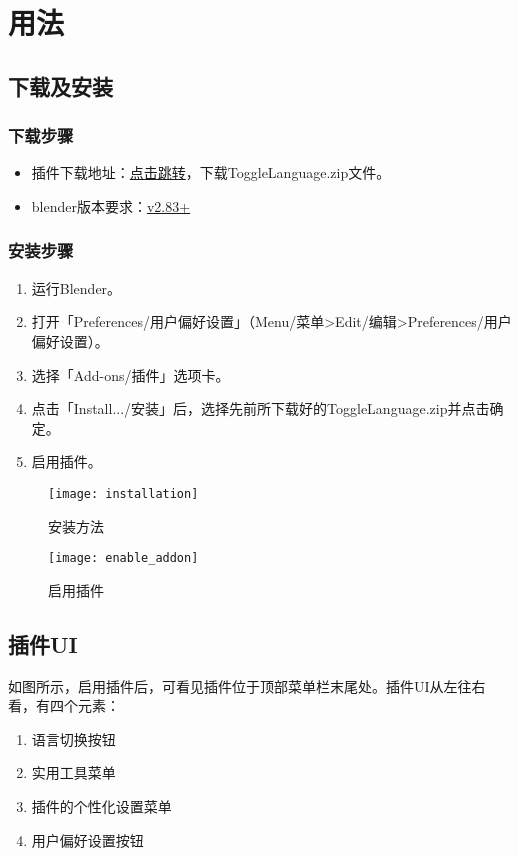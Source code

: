 \documentclass{../../public_resources/doc}
\begin{document}
\section{用法}
\subsection{下载及安装}
\subsubsection{下载步骤}
\begin{itemize}
    \item 插件下载地址：\href{https://github.com/Mister-Kin/ToggleLanguage/releases/latest}{点击跳转}，下载ToggleLanguage.zip文件。
    \item blender版本要求：\href{https://www.blender.org/download/}{v2.83+}
\end{itemize}

\subsubsection{安装步骤}
\begin{enumerate}
    \item 运行Blender。
    \item 打开「Preferences/用户偏好设置」（Menu/菜单>Edit/编辑>Preferences/用户偏好设置）。
    \item 选择「Add-ons/插件」选项卡。
    \item 点击「Install.../安装」后，选择先前所下载好的ToggleLanguage.zip并点击确定。
    \item 启用插件。
\end{enumerate}

\begin{figure}[h!]
    \begin{minipage}[t]{0.47\textwidth}
        \texttt{[image: installation]}
        \caption{安装方法}
    \end{minipage}
    \quad
    \begin{minipage}[t]{0.47\textwidth}
        \texttt{[image: enable\_addon]}
        \caption{启用插件}
        \label{启用插件}
    \end{minipage}
\end{figure}

\subsection{插件UI}
\label{插件UI小节}
如图所示，启用插件后，可看见插件位于顶部菜单栏末尾处。插件UI从左往右看，有四个元素：
\begin{enumerate}
    \item 语言切换按钮
    \item 实用工具菜单
    \item 插件的个性化设置菜单
    \item 用户偏好设置按钮
\end{enumerate}
\end{document}
